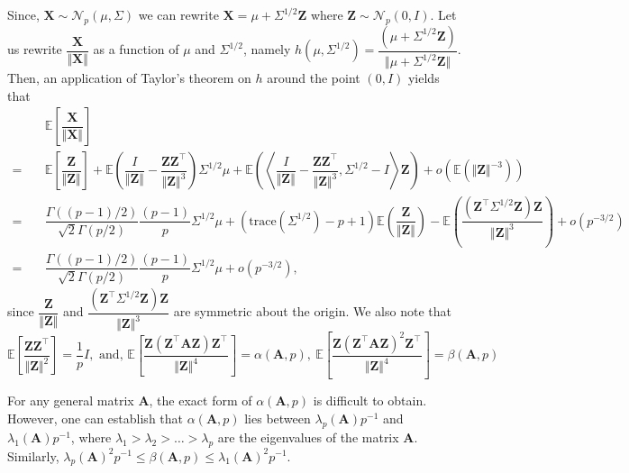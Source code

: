 \documentclass[11pt]{article}
\makeatletter
\def\E{\mathbb{E}}
\newcommand{\bb}[1]{\boldsymbol{#1}}
\newcommand{\tr}{^{\intercal}}
\newcommand{\normdist}{\mathcal{N}}
\theoremstyle{general}
\renewenvironment{proof}[1][\proofname]{\par
    \pushQED{\qed}%
    \normalfont \topsep6\p@\@plus6\p@\relax
    \trivlist
    \item\relax{
        \bfseries
        #1\@addpunct{.}}\hspace\labelsep\ignorespaces
    }{%
     \popQED\endtrivlist\@endpefalse
     }
\numberwithin{equation}{section}
\makeatother
\begin{document}
\begin{proof}
    Since, $\bb{X} \sim \normdist_p(\mu, \Sigma)$ we can rewrite $\bb{X} = \mu + \Sigma^{1/2} \bb{Z}$ where $\bb{Z} \sim \normdist_p(0, I)$. 
    Let us rewrite $\dfrac{\bb{X}}{\Vert \bb{X} \Vert}$ as a function of $\mu$ and $\Sigma^{1/2}$, namely $h(\mu, \Sigma^{1/2}) = \dfrac{(\mu + \Sigma^{1/2}\bb{Z})}{\Vert \mu + \Sigma^{1/2}\bb{Z} \Vert}$. Then, an application of Taylor's theorem on $h$ around the point $(0, I)$ yields that 
    \begin{align*}
        & \E\left[\dfrac{\bb{X}}{\Vert \bb{X} \Vert} \right]\\
        = \quad & \E\left[ \dfrac{\bb{Z}}{\Vert \bb{Z}\Vert} \right] + \E\left( \dfrac{I}{\Vert \bb{Z}\Vert } - \dfrac{\bb{Z}\bb{Z}\tr }{\Vert \bb{Z}\Vert^3} \right)\Sigma^{1/2}\mu + \E\left( \left\langle \dfrac{I}{\Vert \bb{Z}\Vert } - \dfrac{\bb{Z}\bb{Z}\tr }{\Vert \bb{Z}\Vert^3}, \Sigma^{1/2} - I \right\rangle \bb{Z} \right) + o(\E(\Vert \bb{Z}\Vert^{-3}))\\
        = \quad & \dfrac{\Gamma((p-1)/2)}{\sqrt{2}\Gamma(p/2)}\dfrac{(p-1)}{p}\Sigma^{1/2}\mu + (\text{trace}(\Sigma^{1/2}) - p+1) \E\left(\dfrac{\bb{Z}}{\Vert \bb{Z}\Vert}\right) - \E\left(\dfrac{(\bb{Z}\tr \Sigma^{1/2} \bb{Z}) \bb{Z}}{\Vert \bb{Z}\Vert^3} \right) + o(p^{-3/2})\\
        = \quad &  \dfrac{\Gamma((p-1)/2)}{\sqrt{2}\Gamma(p/2)}\dfrac{(p-1)}{p}\Sigma^{1/2}\mu + o(p^{-3/2}),
    \end{align*}
    \noindent since $\dfrac{\bb{Z}}{\Vert \bb{Z}\Vert}$ and $\dfrac{(\bb{Z}\tr \Sigma^{1/2} \bb{Z}) \bb{Z}}{\Vert \bb{Z}\Vert^3}$ are symmetric about the origin. We also note that
    \begin{equation*}
        \E\left[ \dfrac{\bb{ZZ}\tr}{\Vert \bb{Z}\Vert^2} \right]
        = \dfrac{1}{p}I, \text{ and, } 
        \E\left[ \dfrac{\bb{Z} (\bb{Z}\tr \bb{A}\bb{Z}) \bb{Z}\tr }{\Vert \bb{Z}\Vert^4} \right]
        = \alpha(\bb{A}, p), \ 
        \E\left[ \dfrac{\bb{Z} (\bb{Z}\tr \bb{A}\bb{Z})^2 \bb{Z}\tr }{\Vert \bb{Z}\Vert^4} \right]
        = \beta(\bb{A}, p)
    \end{equation*}

    For any general matrix $\bb{A}$, the exact form of $\alpha(\bb{A}, p)$ is difficult to obtain. However, one can establish that $\alpha(\bb{A}, p)$ lies between $\lambda_p(\bb{A})p^{-1}$ and $\lambda_1(\bb{A})p^{-1}$, where $\lambda_1 > \lambda_2 > \dots > \lambda_p$ are the eigenvalues of the matrix $\bb{A}$. Similarly, $\lambda_p(\bb{A})^2p^{-1} \leq \beta(\bb{A}, p) \leq \lambda_1(\bb{A})^2p^{-1}$.


\end{proof}
\end{document}
